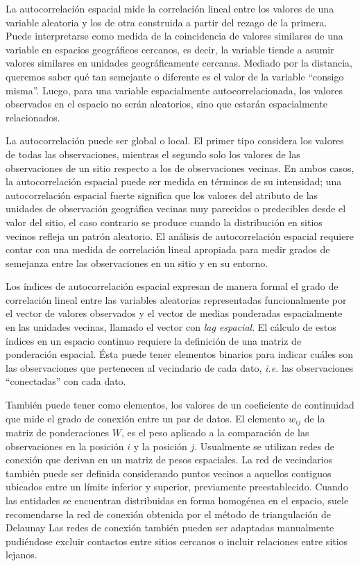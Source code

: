 \documentclass[11pt,b5paper,]{krantz}
\begin{document}
La autocorrelación espacial mide la correlación lineal entre los valores
de una variable aleatoria y los de otra construida a partir del rezago
de la primera. Puede interpretarse como medida de la coincidencia de
valores similares de una variable en espacios geográficos cercanos, es
decir, la variable tiende a asumir valores similares en unidades
geográficamente cercanas. Mediado por la distancia, queremos saber qué
tan semejante o diferente es el valor de la variable ``consigo misma''.
Luego, para una variable espacialmente autocorrelacionada, los valores
observados en el espacio no serán aleatorios, sino que estarán
espacialmente relacionados.

La autocorrelación puede ser global o local. El primer tipo considera
los valores de todas las observaciones, mientras el segundo solo los
valores de las observaciones de un sitio respecto a los de observaciones
vecinas. En ambos casos, la autocorrelación espacial puede ser medida en
términos de su intensidad; una autocorrelación espacial fuerte significa
que los valores del atributo de las unidades de observación geográfica
vecinas muy parecidos o predecibles desde el valor del sitio, el caso
contrario se produce cuando la distribución en sitios vecinos refleja un
patrón aleatorio. El análisis de autocorrelación espacial requiere
contar con una medida de correlación lineal apropiada para medir grados
de semejanza entre las observaciones en un sitio y en su entorno.

Los índices de autocorrelación espacial expresan de manera formal el
grado de correlación lineal entre las variables aleatorias representadas
funcionalmente por el vector de valores observados y el vector de medias
ponderadas espacialmente en las unidades vecinas, llamado el vector con
\emph{lag espacial}. El cálculo de estos índices en un espacio continuo
requiere la definición de una matriz de ponderación espacial. Ésta puede
tener elementos binarios para indicar cuáles son las observaciones que
pertenecen al vecindario de cada dato, \emph{i.e.} las observaciones
``conectadas'' con cada dato.

También puede tener como elementos, los valores de un coeficiente de
continuidad que mide el grado de conexión entre un par de datos. El
elemento \(w_{ij}\) de la matriz de ponderaciones \(W\), es el peso
aplicado a la comparación de las observaciones en la posición \(i\) y la
posición \(j\). Usualmente se utilizan redes de conexión que derivan en
un matriz de pesos espaciales. La red de vecindarios también puede ser
definida considerando puntos vecinos a aquellos contiguos ubicados entre
un límite inferior y superior, previamente preestablecido. Cuando las
entidades se encuentran distribuidas en forma homogénea en el espacio,
suele recomendarse la red de conexión obtenida por el método de
triangulación de Delaunay Las redes de conexión también pueden ser
adaptadas manualmente pudiéndose excluir contactos entre sitios cercanos
o incluir relaciones entre sitios lejanos.
\end{document}
